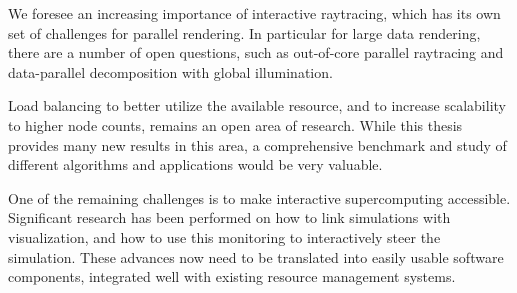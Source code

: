 We foresee an increasing importance of interactive raytracing, which has its
own set of challenges for parallel rendering. In particular for large data
rendering, there are a number of open questions, such as out-of-core parallel
raytracing and data-parallel decomposition with global illumination.

Load balancing to better utilize the available resource, and to increase
scalability to higher node counts, remains an open area of research. While this
thesis provides many new results in this area, a comprehensive benchmark and
study of different algorithms and applications would be very valuable.

One of the remaining challenges is to make interactive supercomputing
accessible. Significant research has been performed on how to link simulations
with visualization, and how to use this monitoring to interactively steer the
simulation. These advances now need to be translated into easily usable
software components, integrated well with existing resource management systems.